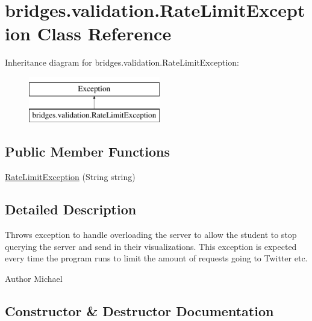 \hypertarget{classbridges_1_1validation_1_1_rate_limit_exception}{}\section{bridges.\+validation.\+Rate\+Limit\+Exception Class Reference}
\label{classbridges_1_1validation_1_1_rate_limit_exception}
Inheritance diagram for bridges.\+validation.\+Rate\+Limit\+Exception\+:\begin{figure}[H]
\begin{center}
\leavevmode
\includegraphics[height=2.000000cm]{classbridges_1_1validation_1_1_rate_limit_exception}
\end{center}
\end{figure}
\subsection*{Public Member Functions}
\begin{DoxyCompactItemize}
\item 
\mbox{\hyperlink{classbridges_1_1validation_1_1_rate_limit_exception_a8375495a80a80213fe9201921c43afbc}{Rate\+Limit\+Exception}} (String string)
\end{DoxyCompactItemize}


\subsection{Detailed Description}
Throws exception to handle overloading the server to allow the student to stop querying the server and send in their visualizations. This exception is expected every time the program runs to limit the amount of requests going to Twitter etc.

\begin{DoxyAuthor}{Author}
Michael 
\end{DoxyAuthor}


\subsection{Constructor \& Destructor Documentation}
\mbox{\label{classbridges_1_1validation_1_1_rate_limit_exception_a8375495a80a80213fe9201921c43afbc}} 
